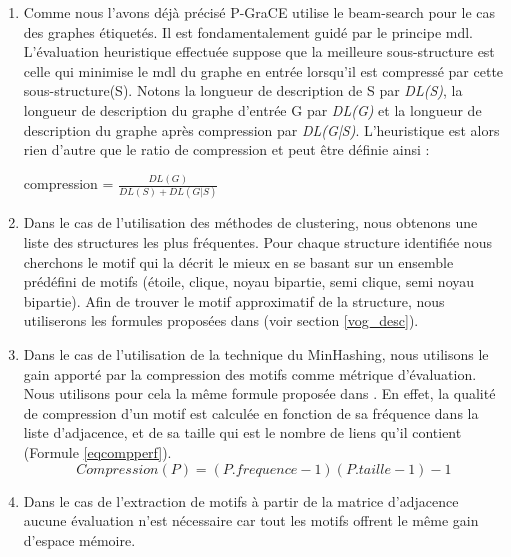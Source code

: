 \documentclass[a4paper,oneside,12pt]{report}
\theoremstyle{definition}
\begin{document}
		 \begin{enumerate}
		 \item Comme nous l'avons déjà précisé P-GraCE utilise le beam-search pour le cas des graphes  étiquetés. Il est fondamentalement guidé par le principe \gls{mdl}. L'évaluation heuristique effectuée suppose que la meilleure sous-structure est celle qui minimise le \gls{mdl} du graphe en entrée lorsqu'il est compressé par cette sous-structure(S). Notons la longueur de description de S par \textit{DL(S)}, la longueur de description du graphe d'entrée G  par \textit{DL(G)} et la longueur de description du graphe après compression par \textit{DL(G|S)}. L'heuristique est alors rien d'autre que le ratio de compression et peut être définie ainsi :
		 
		\begin{center}
		compression = $\frac{DL(G)}{DL(S)+DL(G|S)} $
		\end{center}
		
		\item  Dans le cas de l'utilisation des méthodes de clustering, nous obtenons une liste des structures les plus fréquentes. Pour chaque structure identifiée nous cherchons le motif qui la décrit le mieux en se basant sur un ensemble prédéfini de motifs (étoile, clique, noyau bipartie, semi clique, semi noyau bipartie). Afin de trouver le motif approximatif de la structure, nous utiliserons les formules proposées dans \citep{koutra2015summarizing} (voir section \ref{vog_desc}).
		
		\item Dans le cas de l'utilisation de la technique du MinHashing, nous utilisons le gain apporté par la compression des motifs comme métrique d'évaluation. Nous utilisons pour cela la même formule proposée dans \citep{buehrer2008scalable}. En effet, la qualité de compression d'un motif est calculée en fonction de sa fréquence dans la liste d'adjacence, et de sa taille qui est le nombre de liens qu'il contient (Formule \ref{eqcompperf}).
				\begin{equation}
				Compression(P)=(P.frequence-1)(P.taille-1)-1
				\label{eqcompperf}
				\end{equation}
				
		\item Dans le cas de l'extraction de motifs à partir de la matrice d'adjacence aucune évaluation n'est nécessaire car tout les motifs offrent le même gain d'espace mémoire.
		 
		
		 \end{enumerate}
		 
\end{document}
